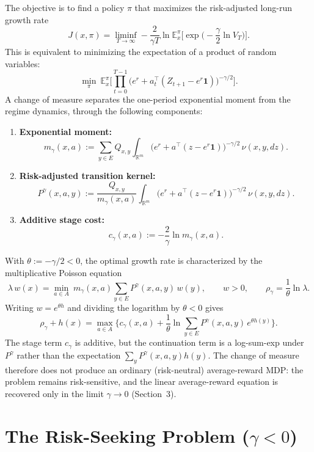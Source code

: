 \documentclass[11pt,a4paper]{article}
\newcommand{\E}{\mathbb{E}}
\newcommand{\R}{\mathbb{R}}
\begin{document}
The objective is to find a policy $\pi$ that maximizes the risk-adjusted long-run growth rate
\begin{equation}\label{eq:criterion}
  J(x,\pi)=\liminf_{T\to\infty}-\frac{2}{\gamma T}\ln\E_x^\pi\Big[\exp\Big(-\frac{\gamma}{2}\ln V_T\Big)\Big].
\end{equation}
This is equivalent to minimizing the expectation of a product of random variables:
\[
  \min_\pi\ \E_x^\pi\Big[\prod_{t=0}^{T-1}\big(e^{r}+a_t^\top(Z_{t+1}-e^{r}\mathbf 1)\big)^{-\gamma/2}\Big].
\]
A change of measure separates the one-period exponential moment from the regime dynamics, through the following components:
\begin{enumerate}
  \item \textbf{Exponential moment:}
  \[
    m_\gamma(x,a):=\sum_{y\in E}Q_{x,y}\int_{\R^m}\big(e^{r}+a^\top(z-e^{r}\mathbf 1)\big)^{-\gamma/2}\,\nu(x,y,dz).
  \]
  \item \textbf{Risk-adjusted transition kernel:}
  \[
    P^\gamma(x,a,y):=\frac{Q_{x,y}}{m_\gamma(x,a)}\int_{\R^m}\big(e^{r}+a^\top(z-e^{r}\mathbf 1)\big)^{-\gamma/2}\,\nu(x,y,dz).
  \]
  \item \textbf{Additive stage cost:}
  \[
    c_\gamma(x,a):=-\frac{2}{\gamma}\ln m_\gamma(x,a).
  \]
\end{enumerate}
With $\theta:=-\gamma/2<0$, the optimal growth rate is characterized by the multiplicative Poisson equation
\begin{equation}\label{eq:mult-poisson}
  \lambda\,w(x)=\min_{a\in A}\ m_\gamma(x,a)\sum_{y\in E}P^\gamma(x,a,y)\,w(y),\qquad w>0,\qquad \rho_\gamma=\frac{1}{\theta}\ln\lambda .
\end{equation}
Writing $w=e^{\theta h}$ and dividing the logarithm by $\theta<0$ gives
\[
  \rho_\gamma+h(x)=\max_{a\in A}\Big\{c_\gamma(x,a)+\frac{1}{\theta}\ln\sum_{y\in E}P^\gamma(x,a,y)\,e^{\theta h(y)}\Big\}.
\]
The stage term $c_\gamma$ is additive, but the continuation term is a log-sum-exp under $P^\gamma$ rather than the expectation $\sum_yP^\gamma(x,a,y)h(y)$. The change of measure therefore does not produce an ordinary (risk-neutral) average-reward MDP: the problem remains risk-sensitive, and the linear average-reward equation is recovered only in the limit $\gamma\to0$ (Section~3).

\section{The Risk-Seeking Problem ($\gamma<0$)}
\end{document}
